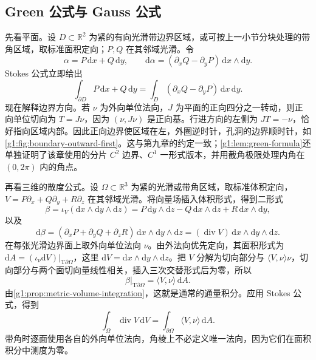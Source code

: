 \subsection{Green 公式与 Gauss 公式}
\label{g1:subsec:1404:05}

先看平面。设 \(D\subset\mathbb R^2\) 为紧的有向光滑带边界区域，或可按上一小节分块处理的带角区域，取标准面积定向；\(P,Q\) 在其邻域光滑。令
\[
	\alpha=P\,\mathrm{d}x+Q\,\mathrm{d}y,\qquad
	\mathrm{d}\alpha=(\partial_xQ-\partial_yP)\,\mathrm{d}x\wedge\mathrm{d}y.
\]
Stokes 公式立即给出
\begin{equation}\label{g1:eq:green-from-stokes}
	\int_{\partial D}P\,\mathrm{d}x+Q\,\mathrm{d}y
	=\int_D(\partial_xQ-\partial_yP)\,\mathrm{d}x\,\mathrm{d}y.
\end{equation}
现在解释边界方向。若 \(\nu\) 为外向单位法向，\(J\) 为平面的正向四分之一转动，则正向单位切向为 \(T=J\nu\)，因为 \((\nu,J\nu)\) 是正向基。行进方向的左侧为 \(JT=-\nu\)，恰好指向区域内部。因此正向边界使区域在左，外圈逆时针，孔洞的边界顺时针，如\cref{g1:fig:boundary-outward-first}。这与第九章的约定一致；\cref{g1:lem:green-formula}还单独证明了该章使用的分片 \(C^2\) 边界、\(C^1\) 一形式版本，并用截角极限处理内角在 \((0,2\pi)\) 内的角点。



再看三维的散度公式。设 \(\Omega\subset\mathbb R^3\) 为紧的光滑或带角区域，取标准体积定向，\(V=P\partial_x+Q\partial_y+R\partial_z\) 在其邻域光滑。将向量场插入体积形式，得到二形式
\[
	\beta=\iota_V(\mathrm{d}x\wedge\mathrm{d}y\wedge\mathrm{d}z)
	=P\,\mathrm{d}y\wedge\mathrm{d}z
	-Q\,\mathrm{d}x\wedge\mathrm{d}z
	+R\,\mathrm{d}x\wedge\mathrm{d}y,
\]
以及
\[
	\mathrm{d}\beta=(\partial_xP+\partial_yQ+\partial_zR)\,
	\mathrm{d}x\wedge\mathrm{d}y\wedge\mathrm{d}z
	=(\operatorname{div}V)\,\mathrm{d}x\wedge\mathrm{d}y\wedge\mathrm{d}z.
\]
在每张光滑边界面上取外向单位法向 \(\nu\)。由外法向优先定向，其面积形式为 \(\mathrm{d}A=(\iota_\nu\mathrm{d}V)|_{\mathrm{T}\partial\Omega}\)，这里 \(\mathrm{d}V=\mathrm{d}x\wedge\mathrm{d}y\wedge\mathrm{d}z\)。把 \(V\) 分解为切向部分与 \(\langle V,\nu\rangle\nu\)，切向部分与两个面切向量线性相关，插入三次交替形式后为零，所以
\[
	\beta|_{\mathrm{T}\partial\Omega}=\langle V,\nu\rangle\,\mathrm{d}A.
\]
由\cref{g1:prop:metric-volume-integration}，这就是通常的通量积分。应用 Stokes 公式，得到
\begin{equation}\label{g1:eq:gauss-divergence-stokes}
	\int_\Omega\operatorname{div}V\,\mathrm{d}V
	=\int_{\partial\Omega}\langle V,\nu\rangle\,\mathrm{d}A.
\end{equation}
带角时逐面使用各自的外向单位法向，角棱上不必定义唯一法向，因为它们在面积积分中测度为零。

